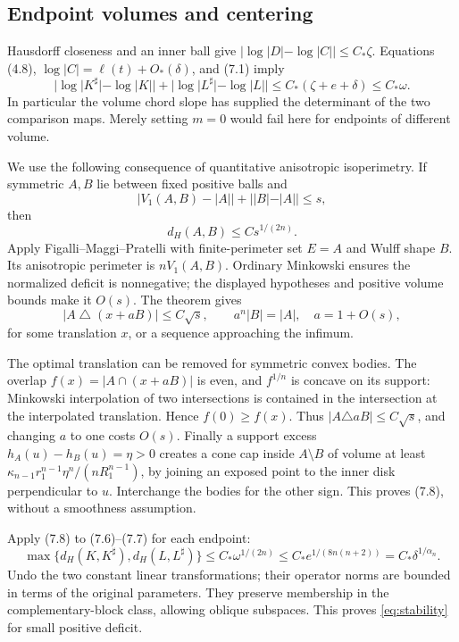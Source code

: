 \documentclass[11pt,reqno]{amsart}
\numberwithin{equation}{section}
\theoremstyle{remark}
\theoremstyle{definition}
\begin{document}
\subsection{Endpoint volumes and centering}

Hausdorff closeness and an inner ball give
\(|\log|D|-\log|C||\le C_*\zeta\).
Equations (4.8), \(\log|C|=\ell(t)+O_*(\delta)\), and (7.1) imply
\[
|\log|K^\sharp|-\log|K||+
|\log|L^\sharp|-\log|L||\le C_*(\zeta+e+\delta)\le C_*\omega.          \tag{7.7}
\]
In particular the volume chord slope has supplied the determinant of the two comparison maps. Merely setting \(m=0\) would fail here for endpoints of different volume.

We use the following consequence of quantitative anisotropic isoperimetry. If symmetric \(A,B\) lie between fixed positive balls and
\[
|V_1(A,B)-|A||+||B|-|A||\le s,
\]
then
\[
d_H(A,B)\le C s^{1/(2n)}.                              \tag{7.8}
\]
Apply Figalli--Maggi--Pratelli \cite[Theorem 1.1]{FMP} with finite-perimeter set \(E=A\) and Wulff shape \(B\). Its anisotropic perimeter is \(nV_1(A,B)\). Ordinary Minkowski ensures the normalized deficit is nonnegative; the displayed hypotheses and positive volume bounds make it \(O(s)\). The theorem gives
\[
|A\mathbin\triangle(x+aB)|\le C\sqrt s,\qquad
a^n|B|=|A|,\quad a=1+O(s),
\]
for some translation \(x\), or a sequence approaching the infimum.

The optimal translation can be removed for symmetric convex bodies. The overlap \(f(x)=|A\cap(x+aB)|\) is even, and \(f^{1/n}\) is concave on its support: Minkowski interpolation of two intersections is contained in the intersection at the interpolated translation. Hence \(f(0)\ge f(x)\). Thus
\(|A\triangle aB|\le C\sqrt s\), and changing \(a\) to one costs \(O(s)\).
Finally a support excess \(h_A(u)-h_B(u)=\eta>0\) creates a cone cap inside \(A\setminus B\) of volume at least
\(\kappa_{n-1}r_1^{n-1}\eta^n/(nR_1^{n-1})\), by joining an exposed point to the inner disk perpendicular to \(u\). Interchange the bodies for the other sign. This proves (7.8), without a smoothness assumption.

Apply (7.8) to (7.6)--(7.7) for each endpoint:
\[
\max\{d_H(K,K^\sharp),d_H(L,L^\sharp)\}
\le C_*\omega^{1/(2n)}
\le C_*e^{1/(8n(n+2))}
=C_*\delta^{1/\alpha_n}.                              \tag{7.9}
\]
Undo the two constant linear transformations; their operator norms are bounded in terms of the original parameters. They preserve membership in the complementary-block class, allowing oblique subspaces. This proves \eqref{eq:stability} for small positive deficit.
\end{document}
